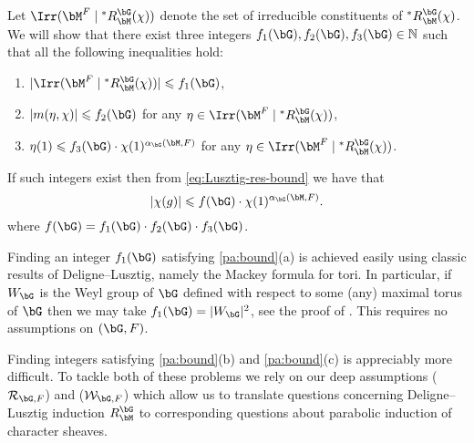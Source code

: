 \documentclass[eqthmnum,nocolour,skinny]{jt-calcs}
\begin{document}
\begin{pa}\label{pa:bound}
Let $\Irr(\bM^F \mid {}^*R_{\bM}^{\bG}(\chi))$ denote the set of irreducible constituents of ${}^*R_{\bM}^{\bG}(\chi)$. We will show that there exist three integers $f_1(\bG),f_2(\bG),f_3(\bG) \in \mathbb{N}$ such that all the following inequalities hold:
\begin{enumerate}
	\item $|\Irr(\bM^F \mid {}^*R_{\bM}^{\bG}(\chi))| \leqslant f_1(\bG)$,
	\item $|m(\eta,\chi)| \leqslant f_2(\bG)$ for any $\eta \in \Irr(\bM^F \mid {}^*R_{\bM}^{\bG}(\chi))$,
	\item $\eta(1) \leqslant f_3(\bG)\cdot\chi(1)^{\alpha_{\bG}(\bM,F)}$ for any $\eta \in \Irr(\bM^F \mid {}^*R_{\bM}^{\bG}(\chi))$.
\end{enumerate}
If such integers exist then from \cref{eq:Lusztig-res-bound} we have that
\begin{equation*}
|\chi(g)| \leqslant f(\bG) \cdot \chi(1)^{\alpha_{\bG}(\bM,F)}.
\end{equation*}
where $f(\bG) = f_1(\bG)\cdot f_2(\bG)\cdot f_3(\bG)$.
\end{pa}


\begin{pa}\label{pa:bound_RLG}
Finding an integer $f_1(\bG)$ satisfying \ref{pa:bound}(a) is achieved easily using classic results of Deligne--Lusztig, namely the Mackey formula for tori. In particular, if $W_{\bG}$ is the Weyl group of $\bG$ defined with respect to some (any) maximal torus of $\bG$ then we may take $f_1(\bG) = |W_{\bG}|^2$, see the proof of \cite[Lem.~17]{lusztig:1976:on-the-finiteness}. This requires no assumptions on $(\bG,F)$.
\end{pa}

\begin{pa}
Finding integers satisfying \ref{pa:bound}(b) and \ref{pa:bound}(c) is appreciably more difficult. To tackle both of these problems we rely on our deep assumptions ($\mathcal{R}_{\bG,F}$) and ($\mathcal{W}_{\bG,F}$) which allow us to translate questions concerning Deligne--Lusztig induction $R_{\bM}^{\bG}$ to corresponding questions about parabolic induction of character sheaves.
\end{pa}
\end{document}
